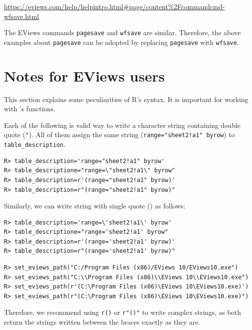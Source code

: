 \url{https://eviews.com/help/helpintro.html\#page/content\%2Fcommandcmd-wfsave.html}

The EViews commands \texttt{pagesave} and \texttt{wfsave} are similar. Therefore, the above examples about \texttt{pagesave} can be adopted by replacing \texttt{pagesave} with \texttt{wfsave}.

\hypertarget{notes-for-eviews-users}{%
\section{Notes for EViews users}\label{notes-for-eviews-users}}

This section explains some peculiarities of R's syntax. It is important for working with 's functions.

Each of the following is valid way to write a character string containing double quote (\texttt{"}). All of them assign the same string (\texttt{range="sheet2!a1"\ byrow}) to \texttt{table\_description}.

\begin{verbatim}
R> table_description='range="sheet2!a1" byrow'
R> table_descriptione="range=\"sheet2!a1\" byrow"
R> table_description=r'(range="sheet2!a1" byrow)'
R> table_description=r"(range="sheet2!a1" byrow)"
\end{verbatim}

Similarly, we can write string with single quote (\texttt{\textquotesingle{}}) as follows:

\begin{verbatim}
R> table_description='range=\'sheet2!a1\' byrow'
R> table_descriptione="range='sheet2!a1' byrow"
R> table_description=r'(range='sheet2!a1' byrow)'
R> table_description=r"(range='sheet2!a1' byrow)"
\end{verbatim}

\begin{verbatim}
R> set_eviews_path("C:/Program Files (x86)/EViews 10/EViews10.exe")
R> set_eviews_path("C:\\Program Files (x86)\\EViews 10\\EViews10.exe")
R> set_eviews_path(r'(C:\Program Files (x86)\EViews 10\EViews10.exe)')
R> set_eviews_path(r"(C:\Program Files (x86)\EViews 10\EViews10.exe)")
\end{verbatim}

Therefore, we recommend using \texttt{r\textquotesingle{}()\textquotesingle{}} or \texttt{r"()"} to write complex strings, as both return the strings written between the braces exactly as they are.

